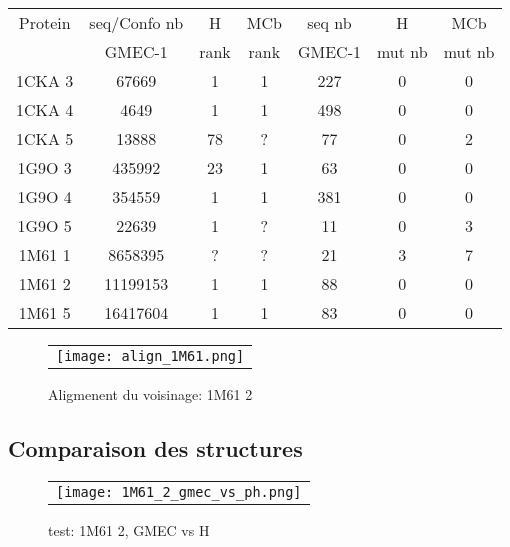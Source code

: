     \begin{table}[h]
      \centering

      \begin{tabular}{ccccccc}


        \toprule
        Protein & seq/Confo nb  & H      & MCb   & seq nb  & H  & MCb  \\
                &     GMEC-1    &  rank &  rank & GMEC-1  & mut nb & mut nb \\
        \cmidrule{1-7}
        1CKA 3 & 67669    & 1  & 1 & 227  & 0 & 0 \\
        1CKA 4 & 4649     & 1  & 1 & 498  & 0 & 0 \\
        1CKA 5 & 13888    & 78 & ? & 77   & 0 & 2 \\
        1G9O 3 & 435992   & 23 & 1 & 63   & 0 & 0 \\
        1G9O 4 & 354559   & 1  & 1 & 381  & 0 & 0 \\
        1G9O 5 & 22639    & 1  & ? &  11  & 0 & 3 \\
        1M61 1 & 8658395  & ?  & ? & 21   & 3 & 7 \\
        1M61 2 & 11199153 & 1  & 1 & 88   & 0 & 0 \\
        1M61 5 & 16417604 & 1  & 1 & 83   & 0 & 0 \\
        \bottomrule
      \end{tabular} 
\label{tab:etude_au_voisinnage}           
\end{table}

    \begin{figure}[h]
      \centering
      \begin{tabular}{c} 
        \texttt{[image: align\_1M61.png]} 
      \end{tabular}
      
      \caption{Aligmenent du voisinage: 1M61 2}
\label{image:Align_Suboptimal}
    \end{figure}


    \clearpage
   \subsection{Comparaison des structures}
    
    \begin{figure}[h]
      \centering
      \begin{tabular}{c} 
        \texttt{[image: 1M61\_2\_gmec\_vs\_ph.png]} 
      \end{tabular}
      
      \caption{test: 1M61 2, GMEC vs H}
\label{image:1M61_2_GMEC_vs_H}
    \end{figure}
    
